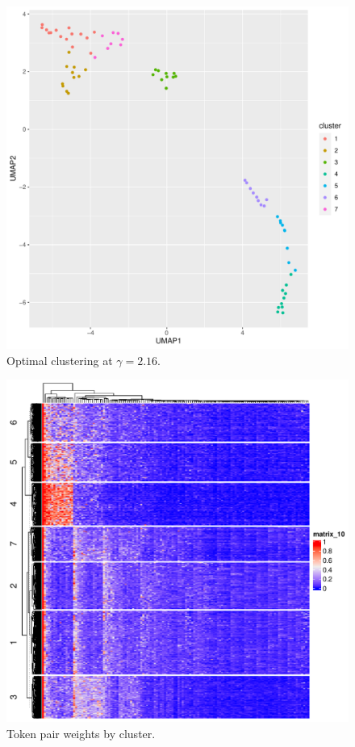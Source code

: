 \documentclass{article}
\begin{document}
\begin{figure}
	\includegraphics[width=\textwidth]{figs/encoding.pdf}
	\caption{Optimal clustering at $\gamma = 2.16$.}
	\label{}
\end{figure}

\begin{figure}
	\includegraphics[width=\textwidth]{figs/clusthm.pdf}
	\caption{Token pair weights by cluster.}
	\label{}
\end{figure}
\end{document}
